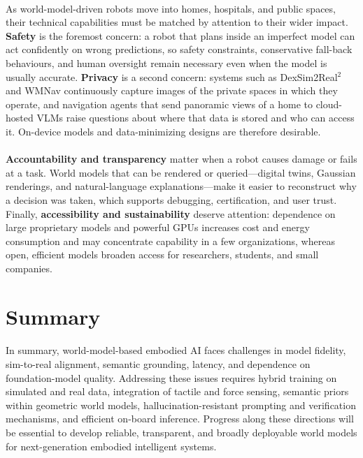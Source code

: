 \documentclass[12pt,a4paper,final]{extreport}
\begin{document}
\paragraph{} As world-model-driven robots move into homes, hospitals, and public spaces, their technical capabilities must be matched by attention to their wider impact. \textbf{Safety} is the foremost concern: a robot that plans inside an imperfect model can act confidently on wrong predictions, so safety constraints, conservative fall-back behaviours, and human oversight remain necessary even when the model is usually accurate. \textbf{Privacy} is a second concern: systems such as DexSim2Real$^2$ and WMNav continuously capture images of the private spaces in which they operate, and navigation agents that send panoramic views of a home to cloud-hosted VLMs raise questions about where that data is stored and who can access it. On-device models and data-minimizing designs are therefore desirable.

\paragraph{} \textbf{Accountability and transparency} matter when a robot causes damage or fails at a task. World models that can be rendered or queried---digital twins, Gaussian renderings, and natural-language explanations---make it easier to reconstruct why a decision was taken, which supports debugging, certification, and user trust. Finally, \textbf{accessibility and sustainability} deserve attention: dependence on large proprietary models and powerful GPUs increases cost and energy consumption and may concentrate capability in a few organizations, whereas open, efficient models broaden access for researchers, students, and small companies.

\section{Summary}

\paragraph{}
In summary, world-model-based embodied AI faces challenges in model fidelity, sim-to-real alignment, semantic grounding, latency, and dependence on foundation-model quality. Addressing these issues requires hybrid training on simulated and real data, integration of tactile and force sensing, semantic priors within geometric world models, hallucination-resistant prompting and verification mechanisms, and efficient on-board inference. Progress along these directions will be essential to develop reliable, transparent, and broadly deployable world models for next-generation embodied intelligent systems.
\end{document}
